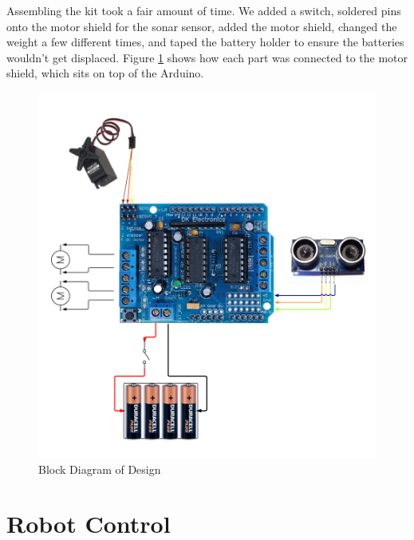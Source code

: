 \documentclass[11pt]{article}
\begin{document}
Assembling the kit took a fair amount of time.  We added a switch, soldered pins onto the motor shield for the sonar sensor, added the motor shield, changed the weight a few different times, and taped the battery holder to ensure the batteries wouldn't get displaced. Figure \ref{block} shows how each part was connected to the motor shield, which sits on top of the Arduino.

	\begin{figure}[h]\centering
	\includegraphics[height=0.85\textwidth]{images/block_diagram.png}
	\caption{Block Diagram of Design}
		\label{block}
	\end{figure}

\section{Robot Control}
\end{document}
